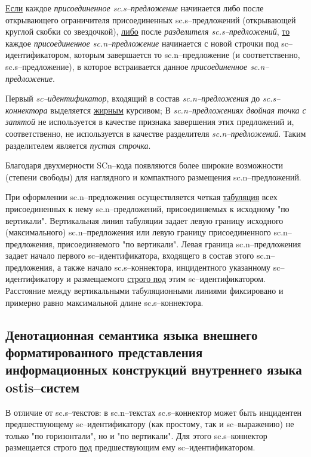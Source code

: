 \uline{Если} каждое \textit{присоединенное sc.s--предложение} начинается либо после открывающего ограничителя присоединенных sc.s--предложений (открывающей круглой скобки со звездочкой), \uline{либо} после \textit{разделителя sc.s--предложений}, \uline{то} каждое \textit{присоединенное sc.n--предложение} начинается с новой строчки под sc--идентификатором, которым завершается то sc.n--предложение (и соответственно, sc.s--предложение), в которое встраивается данное \textit{присоединенное sc.n--предложение}.

Первый \textit{sc--идентификатор}, входящий в состав \textit{sc.n--предложения} до \textit{sc.s--коннектора} выделяется \uline{жирным} курсивом;
В \textit{sc.n--предложениях двойная точка с запятой} не используется в качестве признака завершения этих предложений и, соответственно, не используется в качестве разделителя \textit{sc.n--предложений}. Таким разделителем является \textit{пустая строчка}.

Благодаря двухмерности SCn--кода появляются более широкие возможности (степени свободы) для наглядного и компактного размещения sc.n--предложений.

При оформлении sc.n--предложения осуществляется четкая \uline{табуляция} всех присоединенных к нему sc.n--предложений, присоединяемых к исходному "по вертикали"{}. Вертикальная линия табуляции задает левую границу исходного (максимального) sc.n--предложения или левую границу присоединенного sc.n--предложения, присоединяемого "по вертикали". Левая граница sc.n--предложения задает начало первого sc--идентификатора, входящего в состав этого \mbox{sc.n--предложения}, а также начало sc.s--коннектора, инцидентного указанному \mbox{sc--идентификатору} и размещаемого \uline{строго под} этим sc--идентификатором. Расстояние между вертикальными табуляционными линиями фиксировано и примерно равно максимальной длине sc.s--коннектора.

\subsection{Денотационная семантика языка внешнего форматированного представления информационных конструкций внутреннего языка ostis--систем}


В отличие от sc.s--текстов: в sc.n--текстах sc.s--коннектор может быть инцидентен предшествующему sc--идентификатору (как простому, так и sc--выражению) не только "по горизонтали"{}, но и "по вертикали"{}. Для этого sc.s--коннектор размещается строго \uline{под} предшествующим ему sc--идентификатором.

